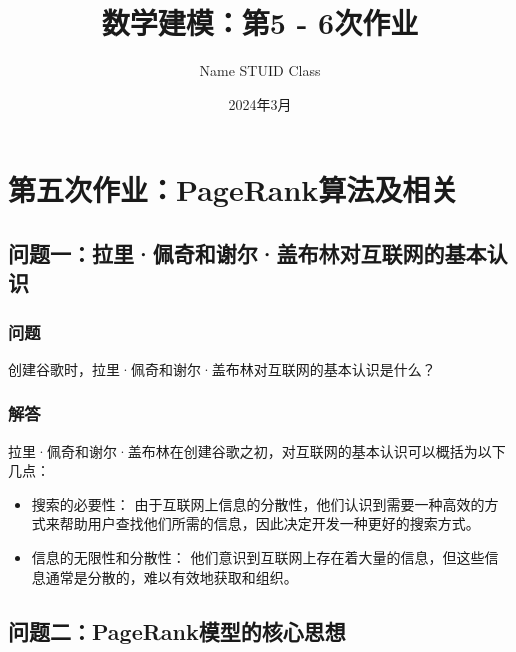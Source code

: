 \documentclass[a4,10pt,zihao=-4]{ctexart}
\begin{document}
\title{数学建模：第5 - 6次作业}

\author{Name STUID Class}
\date{2024年3月}
\maketitle
\tableofcontents
\newpage
{}
\newpage

\section{第五次作业：\textbf{PageRank}算法及相关}
\subsection{问题一：拉里·佩奇和谢尔·盖布林对互联网的基本认识}
\subsubsection{问题}
创建谷歌时，拉里·佩奇和谢尔·盖布林对互联网的基本认识是什么？

\subsubsection{解答}

拉里·佩奇和谢尔·盖布林在创建谷歌之初，对互联网的基本认识可以概括为以下几点：

\begin{itemize}
    \item 搜索的必要性： 由于互联网上信息的分散性，他们认识到需要一种高效的方式来帮助用户查找他们所需的信息，因此决定开发一种更好的搜索方式。
    \item 信息的无限性和分散性： 他们意识到互联网上存在着大量的信息，但这些信息通常是分散的，难以有效地获取和组织。
\end{itemize}

\subsection{问题二：\textbf{PageRank}模型的核心思想}
\end{document}
